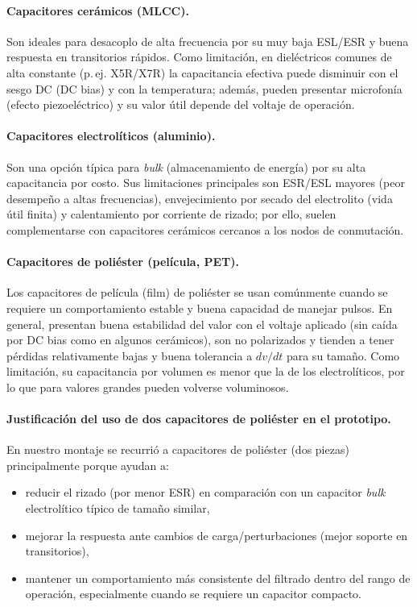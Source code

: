 \documentclass[12pt,a4paper]{article}
\begin{document}
\paragraph{Capacitores cerámicos (MLCC).}
Son ideales para desacoplo de alta frecuencia por su muy baja ESL/ESR y buena respuesta en transitorios rápidos. Como limitación, en dieléctricos comunes de alta constante (p.\,ej. X5R/X7R) la capacitancia efectiva puede disminuir con el sesgo DC (DC bias) y con la temperatura; además, pueden presentar microfonía (efecto piezoeléctrico) y su valor útil depende del voltaje de operación.

\paragraph{Capacitores electrolíticos (aluminio).}
Son una opción típica para \textit{bulk} (almacenamiento de energía) por su alta capacitancia por costo. Sus limitaciones principales son ESR/ESL mayores (peor desempeño a altas frecuencias), envejecimiento por secado del electrolito (vida útil finita) y calentamiento por corriente de rizado; por ello, suelen complementarse con capacitores cerámicos cercanos a los nodos de conmutación.

\paragraph{Capacitores de poliéster (película, PET).}
Los capacitores de película (film) de poliéster se usan comúnmente cuando se requiere un comportamiento estable y buena capacidad de manejar pulsos. En general, presentan buena estabilidad del valor con el voltaje aplicado (sin caída por DC bias como en algunos cerámicos), son no polarizados y tienden a tener pérdidas relativamente bajas y buena tolerancia a $dv/dt$ para su tamaño. Como limitación, su capacitancia por volumen es menor que la de los electrolíticos, por lo que para valores grandes pueden volverse voluminosos.

\paragraph{Justificación del uso de dos capacitores de poliéster en el prototipo.}
En nuestro montaje se recurrió a capacitores de poliéster (dos piezas) principalmente porque ayudan a:
\begin{itemize}[nosep]
    \item reducir el rizado (por menor ESR) en comparación con un capacitor \textit{bulk} electrolítico típico de tamaño similar,
    \item mejorar la respuesta ante cambios de carga/perturbaciones (mejor soporte en transitorios),
    \item mantener un comportamiento más consistente del filtrado dentro del rango de operación, especialmente cuando se requiere un capacitor compacto.
\end{itemize}
\end{document}
